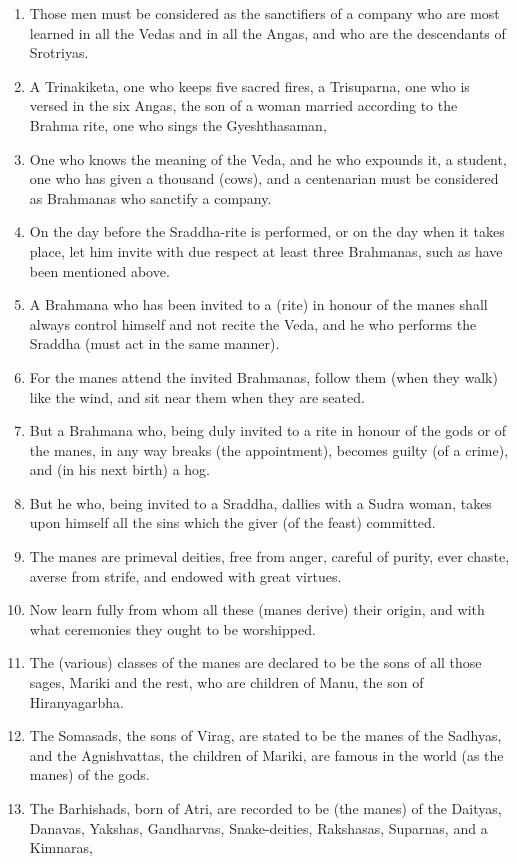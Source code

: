 \begin{enumerate}
\item Those men must be considered as the sanctifiers of a company who are most learned in all the Vedas and in all the Angas, and who are the descendants of Srotriyas.
\item A Trinakiketa, one who keeps five sacred fires, a Trisuparna, one who is versed in the six Angas, the son of a woman married according to the Brahma rite, one who sings the Gyeshthasaman,
\item One who knows the meaning of the Veda, and he who expounds it, a student, one who has given a thousand (cows), and a centenarian must be considered as Brahmanas who sanctify a company.
\item On the day before the Sraddha-rite is performed, or on the day when it takes place, let him invite with due respect at least three Brahmanas, such as have been mentioned above.
\item A Brahmana who has been invited to a (rite) in honour of the manes shall always control himself and not recite the Veda, and he who performs the Sraddha (must act in the same manner).
\item For the manes attend the invited Brahmanas, follow them (when they walk) like the wind, and sit near them when they are seated.
\item But a Brahmana who, being duly invited to a rite in honour of the gods or of the manes, in any way breaks (the appointment), becomes guilty (of a crime), and (in his next birth) a hog.
\item But he who, being invited to a Sraddha, dallies with a Sudra woman, takes upon himself all the sins which the giver (of the feast) committed.
\item The manes are primeval deities, free from anger, careful of purity, ever chaste, averse from strife, and endowed with great virtues.
\item Now learn fully from whom all these (manes derive) their origin, and with what ceremonies they ought to be worshipped.
\item The (various) classes of the manes are declared to be the sons of all those sages, Mariki and the rest, who are children of Manu, the son of Hiranyagarbha.
\item The Somasads, the sons of Virag, are stated to be the manes of the Sadhyas, and the Agnishvattas, the children of Mariki, are famous in the world (as the manes) of the gods.
\item The Barhishads, born of Atri, are recorded to be (the manes) of the Daityas, Danavas, Yakshas, Gandharvas, Snake-deities, Rakshasas, Suparnas, and a Kimnaras,

\end{enumerate}
